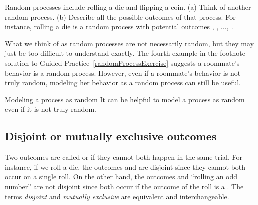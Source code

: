 \begin{exercisewrap}
\begin{nexercise} \label{randomProcessExercise}
Random processes include rolling a die and flipping a coin. (a) Think of another random process. (b) Describe all the possible outcomes of that process. For instance, rolling a die is a random process with potential outcomes , , ...,~.~\footnotemark
\end{nexercise}
\end{exercisewrap}

What we think of as random processes are not necessarily random, but they may just be too difficult to understand exactly. The fourth example in the footnote solution to Guided Practice~\ref{randomProcessExercise} suggests a roommate's behavior is a random process. However, even if a roommate's behavior is not truly random, modeling her behavior as a random process can still be useful.

\begin{onebox}{Modeling a process as random}
It can be helpful to model a process as random even if it is not truly random.\end{onebox}


\subsection{Disjoint or mutually exclusive outcomes}


Two outcomes are called  or  if they cannot both happen in the same trial. For instance, if we roll a die, the outcomes  and  are disjoint since they cannot both occur on a single roll. On the other hand, the outcomes  and ``rolling an odd number'' are not disjoint since both occur if the outcome of the roll is a . The terms \emph{disjoint} and \emph{mutually exclusive} are equivalent and interchangeable.

